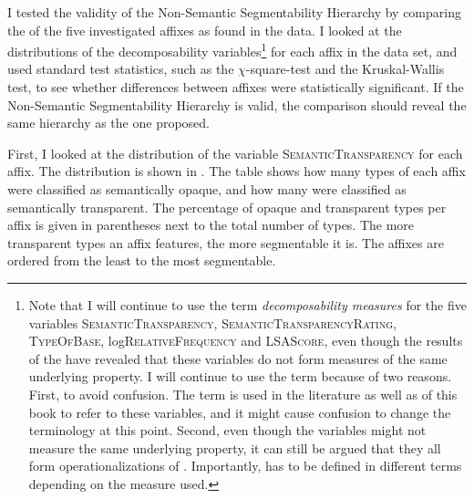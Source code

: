 I tested the validity of the Non-Semantic Segmentability Hierarchy by comparing the  of the five investigated affixes as found in the data. I looked at the distributions of the decomposability variables\footnote{Note that I will continue to use the term \textit{{decomposability} measures} for the five variables \textsc{SemanticTransparency}, \textsc{SemanticTransparencyRating}, \textsc{TypeOfBase}, log\textsc{RelativeFrequency} and \textsc{LSAScore}, even though the results of the  have revealed that these variables do not form measures of the same underlying property. I will continue to use the term  because of two reasons. First, to avoid confusion. The term is used in the literature as well as  of this book to refer to these variables, and it might cause confusion to change the terminology at this point. Second, even though the variables might not measure the same underlying property, it can still be argued that they all form operationalizations of . Importantly,  has to be defined in different terms depending on the  measure used.} for each affix in the data set, and used standard test statistics, such as the $\chi$-square-test and the Kruskal-Wallis test, to see whether differences between affixes were statistically significant.
If the Non-Semantic Segmentability Hierarchy is valid, the comparison should reveal the same  hierarchy  as the one proposed. 


First, I looked at the distribution of the variable \textsc{SemanticTransparency} for each affix. The distribution is shown in . The table shows how many types of each affix were classified as semantically opaque, and how many were classified as semantically transparent. The percentage of opaque and transparent types per affix is given in parentheses next to the total number of  types. The more transparent types an affix features, the more segmentable it is. The affixes are ordered from the least to the most segmentable.




